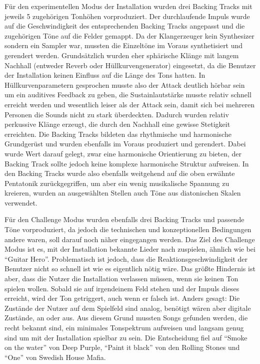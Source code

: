 Für den experimentellen Modus der Installation wurden drei Backing Tracks mit jeweils 5 zugehörigen Tonhöhen vorproduziert. Der durchlaufende Impuls wurde auf die Geschwindigkeit des entsprechenden Backing Tracks angepasst und die zugehörigen Töne auf die Felder gemappt. Da der Klangerzeuger kein Synthesizer sondern ein Sampler war, mussten die Einzeltöne im Voraus synthetisiert und gerendert werden. Grundsätzlich wurden eher sphärische Klänge mit langem Nachhall (entweder Reverb oder Hüllkurvengenerator) eingesetzt, da die Benutzer der Installation keinen Einfluss auf die Länge des Tons hatten. In Hüllkurvenparametern gesprochen musste also der Attack deutlich hörbar sein um ein auditives Feedback zu geben, die Sustainlautstärke musste relativ schnell erreicht werden und wesentlich leiser als der Attack sein, damit sich bei mehreren Personen die Sounds nicht zu stark überdeckten. Dadurch wurden relativ perkussive Klänge erzeugt, die durch den Nachhall eine gewisse Stetigkeit erreichten. Die Backing Tracks bildeten das rhythmische und harmonische Grundgerüst und wurden ebenfalls im Voraus produziert und gerendert. Dabei wurde Wert darauf gelegt, zwar eine harmonische Orientierung zu bieten, der Backing Track sollte jedoch keine komplexe harmonische Struktur aufweisen. In den Backing Tracks wurde also ebenfalls weitgehend auf die oben erwähnte Pentatonik zurückgegriffen, um aber ein wenig musikalische Spannung zu kreieren, wurden an ausgewählten Stellen auch Töne aus diatonischen Skalen verwendet.

Für den Challenge Modus wurden ebenfalls drei Backing Tracks und passende Töne vorproduziert, da jedoch die technischen und konzeptionellen Bedingungen andere waren, soll darauf noch näher eingegangen werden. Das Ziel des Challenge Modus ist es, mit der Installation bekannte Lieder nach zuspielen, ähnlich wie bei \enquote{Guitar Hero}. Problematisch ist jedoch, dass die Reaktionsgeschwindigkeit der Benutzer nicht so schnell ist wie es eigentlich nötig wäre. Das größte Hindernis ist aber, dass die Nutzer die Installation verlassen müssen, wenn sie keinen Ton spielen wollen. Sobald sie auf irgendeinem Feld stehen und der Impuls dieses erreicht, wird der Ton getriggert, auch wenn er falsch ist. Anders gesagt: Die Zustände der Nutzer auf dem Spielfeld sind analog, benötigt wären aber digitale Zustände, an oder aus. Aus diesem Grund mussten Songs gefunden werden, die recht bekannt sind, ein minimales Tonspektrum aufweisen und langsam genug sind um mit der Installation spielbar zu sein. Die Entscheidung fiel auf \enquote{Smoke on the water} von Deep Purple, \enquote{Paint it black} von den Rolling Stones und \enquote{One} von Swedish House Mafia.

